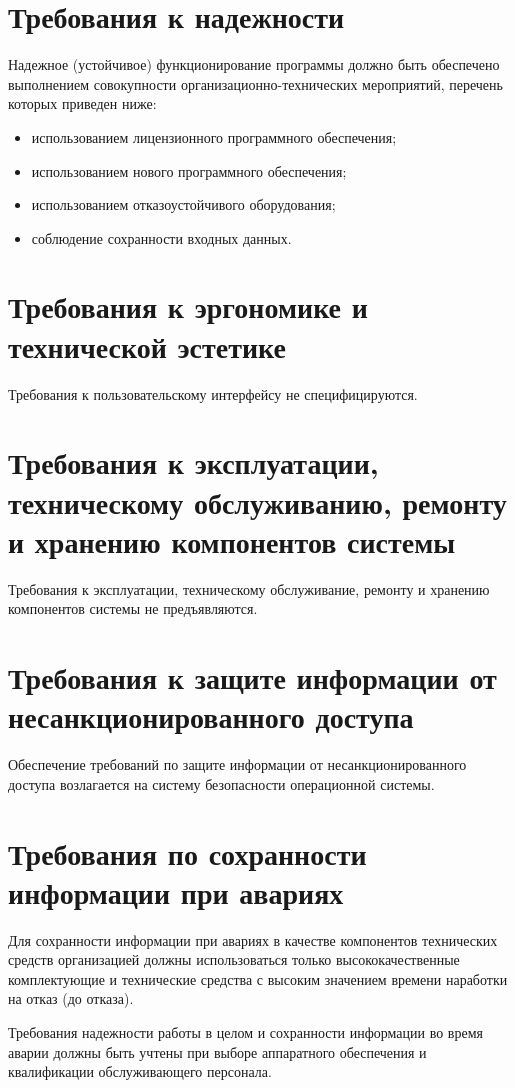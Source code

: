 \section{Требования к надежности}
Надежное (устойчивое) функционирование программы должно быть обеспечено выполнением совокупности 
организационно-технических мероприятий, перечень которых приведен ниже: 
\begin{itemize}
    \item использованием лицензионного программного обеспечения; 
    \item использованием нового программного обеспечения;
    \item использованием отказоустойчивого оборудования;
    \item соблюдение сохранности входных данных.
\end{itemize}

\section{Требования к эргономике и технической эстетике}
Требования к пользовательскому интерфейсу не специфицируются.

\section{Требования к эксплуатации, техническому обслуживанию, ремонту и хранению компонентов системы}
Требования к эксплуатации, техническому обслуживание, ремонту и хранению компонентов системы 
не предъявляются.

\section{Требования к защите информации от несанкционированного доступа}
Обеспечение требований по защите информации от несанкционированного доступа возлагается на систему 
безопасности операционной системы.

\section{Требования по сохранности информации при авариях}
Для сохранности информации при авариях в качестве компонентов технических средств организацией должны 
использоваться только высококачественные комплектующие и технические средства с высоким значением времени 
наработки на отказ (до отказа).

Требования надежности работы в целом и сохранности информации во время аварии должны быть учтены при выборе 
аппаратного обеспечения и квалификации обслуживающего персонала.

